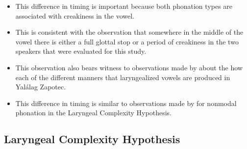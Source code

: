 \documentclass[12pt, letterpaper]{article}
\begin{document}
\begin{itemize}
\begin{itemize}
	\end{itemize}
	\item This difference in timing is important because both phonation types are associated with creakiness in the vowel. 
	\item This is consistent with the observation that somewhere in the middle of the vowel there is either a full glottal stop or a period of creakiness in the two speakers that were evaluated for this study. 
	\item This observation also bears witness to observations made by \citet{avelinoAcousticElectroglottographicAnalyses2010} about the how each of the different manners that laryngealized vowels are produced in Yalálag Zapotec.
	\item This difference in timing is similar to observations made by \citet{silvermanLaryngealComplexityOtomanguean1997,silvermanPhasingRecoverability1997,blankenshipTimeCourseBreathiness1997,blankenshipTimingNonmodalPhonation2002} for nonmodal phonation in the Laryngeal Complexity Hypothesis.
\end{itemize}


\subsection{Laryngeal Complexity Hypothesis} \label{sec:LCH}
\end{document}
